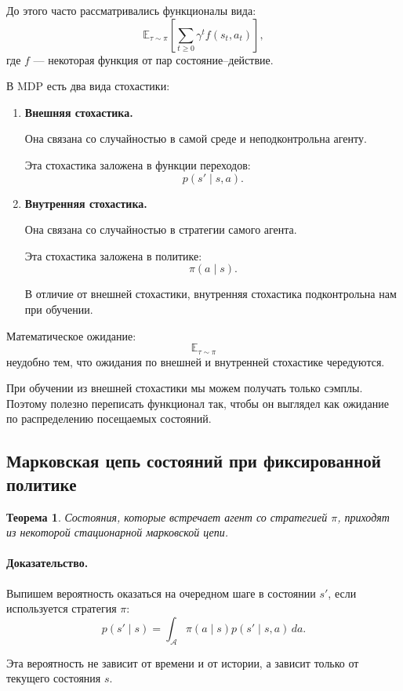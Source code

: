 \documentclass[12pt,a4paper]{article}
\newtheorem{theorem}{Теорема}
\begin{document}
До этого часто рассматривались функционалы вида:
\[
\mathbb E_{\tau\sim\pi}
\left[
\sum_{t\ge 0}
\gamma^t
f(s_t,a_t)
\right],
\]
где $f$ --- некоторая функция от пар состояние--действие.

В MDP есть два вида стохастики:

\begin{enumerate}
    \item \textbf{Внешняя стохастика.}

    Она связана со случайностью в самой среде и неподконтрольна агенту.

    Эта стохастика заложена в функции переходов:
    \[
    p(s'\mid s,a).
    \]

    \item \textbf{Внутренняя стохастика.}

    Она связана со случайностью в стратегии самого агента.

    Эта стохастика заложена в политике:
    \[
    \pi(a\mid s).
    \]

    В отличие от внешней стохастики, внутренняя стохастика подконтрольна нам при обучении.
\end{enumerate}

Математическое ожидание:
\[
\mathbb E_{\tau\sim\pi}
\]
неудобно тем, что ожидания по внешней и внутренней стохастике чередуются.

При обучении из внешней стохастики мы можем получать только сэмплы. Поэтому полезно переписать функционал так, чтобы он выглядел как ожидание по распределению посещаемых состояний.

\subsection{Марковская цепь состояний при фиксированной политике}

\begin{theorem}
Состояния, которые встречает агент со стратегией $\pi$, приходят из некоторой стационарной марковской цепи.
\end{theorem}

\paragraph{Доказательство.}

Выпишем вероятность оказаться на очередном шаге в состоянии $s'$, если используется стратегия $\pi$:
\[
p(s'\mid s)
=
\int_{\mathcal A}
\pi(a\mid s)
p(s'\mid s,a)
\,da.
\]

Эта вероятность не зависит от времени и от истории, а зависит только от текущего состояния $s$.
\end{document}
